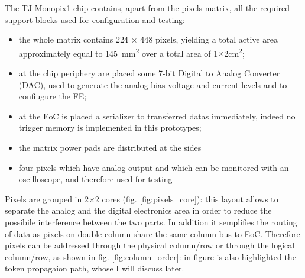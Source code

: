 The TJ-Monopix1 chip contains, apart from the pixels matrix, all the required support blocks used for configuration and testing: 
\begin{itemize}
    \item  the whole matrix contains 224 $\times$ 448 pixels, yielding a total active area approximately equal to \SI{145}{mm\squared} over a total area of 1$\times$2\si{cm\squared};
    \item at the chip periphery are placed some 7-bit Digital to Analog Converter (DAC), used to generate the analog bias voltage and current levels and to confiugure the FE; 
    \item at the EoC is placed a serializer to transferred datas immediately, indeed no trigger memory is implemented in this prototypes;
    \item the matrix power pads are distributed at the sides
    \item four pixels which have analog output and which can be monitored with an oscilloscope, and therefore used for testing
\end{itemize}    
Pixels are grouped in 2$\times$2 cores (fig. \ref{fig:pixels_core}): this layout allows to separate the analog and the digital electronics area in order to reduce the possibile interference between the two parts. In addition it semplifies the routing of data as pixels on double column share the same column-bus to EoC. Therefore pixels can be addressed through the physical column/row or through the logical column/row, as shown in fig. \ref{fig:column_order}: in figure is also highlighted the token propagaion path, whose I will discuss later.


